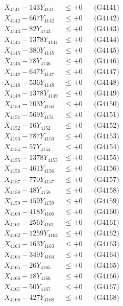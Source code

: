 \documentclass[a4paper,10pt]{article}
\begin{document}
{\begin{align}
\allowbreak
X_{4141} - 143Y_{4141} &\leq +0 && \text{(G4141)} \\
X_{4142} - 667Y_{4142} &\leq +0 && \text{(G4142)} \\
X_{4143} - 82Y_{4143} &\leq +0 && \text{(G4143)} \\
X_{4144} - 1378Y_{4144} &\leq +0 && \text{(G4144)} \\
X_{4145} - 380Y_{4145} &\leq +0 && \text{(G4145)} \\
X_{4146} - 78Y_{4146} &\leq +0 && \text{(G4146)} \\
X_{4147} - 647Y_{4147} &\leq +0 && \text{(G4147)} \\
X_{4148} - 536Y_{4148} &\leq +0 && \text{(G4148)} \\
X_{4149} - 1378Y_{4149} &\leq +0 && \text{(G4149)} \\
X_{4150} - 703Y_{4150} &\leq +0 && \text{(G4150)} \\
\allowbreak
X_{4151} - 569Y_{4151} &\leq +0 && \text{(G4151)} \\
X_{4152} - 16Y_{4152} &\leq +0 && \text{(G4152)} \\
X_{4153} - 787Y_{4153} &\leq +0 && \text{(G4153)} \\
X_{4154} - 57Y_{4154} &\leq +0 && \text{(G4154)} \\
X_{4155} - 1378Y_{4155} &\leq +0 && \text{(G4155)} \\
X_{4156} - 461Y_{4156} &\leq +0 && \text{(G4156)} \\
X_{4157} - 770Y_{4157} &\leq +0 && \text{(G4157)} \\
X_{4158} - 48Y_{4158} &\leq +0 && \text{(G4158)} \\
X_{4159} - 459Y_{4159} &\leq +0 && \text{(G4159)} \\
X_{4160} - 418Y_{4160} &\leq +0 && \text{(G4160)} \\
\allowbreak
X_{4161} - 256Y_{4161} &\leq +0 && \text{(G4161)} \\
X_{4162} - 1259Y_{4162} &\leq +0 && \text{(G4162)} \\
X_{4163} - 163Y_{4163} &\leq +0 && \text{(G4163)} \\
X_{4164} - 349Y_{4164} &\leq +0 && \text{(G4164)} \\
X_{4165} - 26Y_{4165} &\leq +0 && \text{(G4165)} \\
X_{4166} - 18Y_{4166} &\leq +0 && \text{(G4166)} \\
X_{4167} - 50Y_{4167} &\leq +0 && \text{(G4167)} \\
X_{4168} - 427Y_{4168} &\leq +0 && \text{(G4168)} \\

\end{align}}
\end{document}
